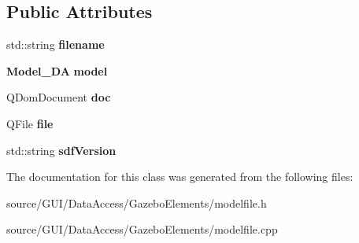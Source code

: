 \subsection*{Public Attributes}
\begin{DoxyCompactItemize}
\item 
std\+::string {\bfseries filename}\label{class_model_file_a23e8e730ee29ad70470629e00921ab91}

\item 
{\bf Model\+\_\+\+DA} {\bfseries model}\label{class_model_file_a860903e8b53719e52fc25445b6ce6794}

\item 
Q\+Dom\+Document {\bfseries doc}\label{class_model_file_aceaeb25388e1844a369c73ece492804f}

\item 
Q\+File {\bfseries file}\label{class_model_file_a5a1140df671d5303f0561faaf74b239e}

\item 
std\+::string {\bfseries sdf\+Version}\label{class_model_file_a636491c88874132cc2d617861b06e3d0}

\end{DoxyCompactItemize}


The documentation for this class was generated from the following files\+:\begin{DoxyCompactItemize}
\item 
source/\+G\+U\+I/\+Data\+Access/\+Gazebo\+Elements/modelfile.\+h\item 
source/\+G\+U\+I/\+Data\+Access/\+Gazebo\+Elements/modelfile.\+cpp\end{DoxyCompactItemize}
